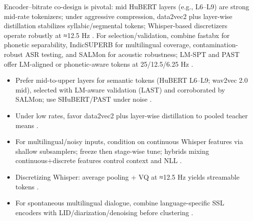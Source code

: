 Encoder–bitrate co-design is pivotal: mid HuBERT layers (e.g., L6–L9) are strong mid-rate tokenizers; under aggressive compression, data2vec2 plus layer-wise distillation stabilizes syllabic/segmental tokens; Whisper-based discretizers operate robustly at ≈12.5 Hz \cite{wu2024speechcomposerunifyingmultiplespeechtask,baade2024syllablelmlearningcoarsesemanticunitsspe,zeng2024scalingspeechtextpretrainingsyntheticint}. For selection/validation, combine fastabx for phonetic separability, IndicSUPERB for multilingual coverage, contamination-robust ASR testing, and SALMon for acoustic robustness; LM-SPT and PAST offer LM-aligned or phonetic-aware tokens at 25/12.5/6.25 Hz \cite{poli2025fastabxlibraryefficientcomputationabxdis,entry2025indicsuperbspeechprocessinguniversalperf,tseng2025evaluationllmsspeechisoftenflawedtestset,maimon2025salmonsuiteacousticlanguagemodelevaluati,jo2025lmsptalignedsemanticdistillationspeechto,har-tuv2025pastphoneticacousticspeechtokenizer}.

\begin{itemize}
  \item Prefer mid-to-upper layers for semantic tokens (HuBERT L6–L9; wav2vec 2.0 mid), selected with LM-aware validation (LAST) and corroborated by SALMon; use SHuBERT/PAST under noise \cite{turetzky2024lastlanguagemodelawarespeechtokenization,maimon2025salmonsuiteacousticlanguagemodelevaluati,entry2025selectivehubertselfsupervisedpretraining,har-tuv2025pastphoneticacousticspeechtokenizer,chen2023reducingbarriersselfsupervisedlearninghu}.
  \item Under low rates, favor data2vec2 plus layer-wise distillation to pooled teacher means \cite{baade2024syllablelmlearningcoarsesemanticunitsspe}.
  \item For multilingual/noisy inputs, condition on continuous Whisper features via shallow subsamplers; freeze then stage-wise tune; hybrids mixing continuous+discrete features control context and NLL \cite{verma2024whispergpthybridrepresentationaudiolarge,nguyen2025qwenvsgemmaintegrationwhispercomparative,li2025transsionmultilingualspeechrecognitionsy}.
  \item Discretizing Whisper: average pooling + VQ at ≈12.5 Hz yields streamable tokens \cite{zeng2024scalingspeechtextpretrainingsyntheticint}.
  \item For spontaneous multilingual dialogue, combine language-specific SSL encoders with LID/diarization/denoising before clustering \cite{nakata2024jchatjapaneselargescalespokendialoguecor}.
\end{itemize}

